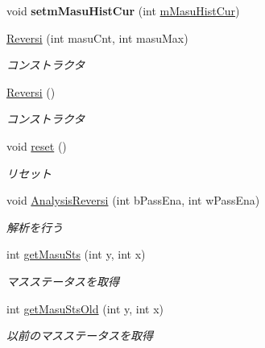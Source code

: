 \begin{DoxyCompactItemize}
void {\bfseries setm\+Masu\+Hist\+Cur} (int \mbox{\hyperlink{classjp_1_1gr_1_1java__conf_1_1yuta__yoshinaga_1_1reversi_1_1model_1_1_reversi_aaedf62ec913875540109bfbe01bb1969}{m\+Masu\+Hist\+Cur}})
\item 
\mbox{\hyperlink{classjp_1_1gr_1_1java__conf_1_1yuta__yoshinaga_1_1reversi_1_1model_1_1_reversi_a22abbc9c1a2016388dafb08dc9a7b820}{Reversi}} (int masu\+Cnt, int masu\+Max)
\begin{DoxyCompactList}\small\item\em コンストラクタ \end{DoxyCompactList}\item 
\mbox{\hyperlink{classjp_1_1gr_1_1java__conf_1_1yuta__yoshinaga_1_1reversi_1_1model_1_1_reversi_a26c832c23ff4e38dd2bcf990d05296d6}{Reversi}} ()
\begin{DoxyCompactList}\small\item\em コンストラクタ \end{DoxyCompactList}\item 
void \mbox{\hyperlink{classjp_1_1gr_1_1java__conf_1_1yuta__yoshinaga_1_1reversi_1_1model_1_1_reversi_a497552844cbae36207f2d8c836a26b8e}{reset}} ()
\begin{DoxyCompactList}\small\item\em リセット \end{DoxyCompactList}\item 
void \mbox{\hyperlink{classjp_1_1gr_1_1java__conf_1_1yuta__yoshinaga_1_1reversi_1_1model_1_1_reversi_a43098c043d0424bb5e5e60db358a324d}{Analysis\+Reversi}} (int b\+Pass\+Ena, int w\+Pass\+Ena)
\begin{DoxyCompactList}\small\item\em 解析を行う \end{DoxyCompactList}\item 
int \mbox{\hyperlink{classjp_1_1gr_1_1java__conf_1_1yuta__yoshinaga_1_1reversi_1_1model_1_1_reversi_aaab64f3b70ed5da5f0707933cbf82802}{get\+Masu\+Sts}} (int y, int x)
\begin{DoxyCompactList}\small\item\em マスステータスを取得 \end{DoxyCompactList}\item 
int \mbox{\hyperlink{classjp_1_1gr_1_1java__conf_1_1yuta__yoshinaga_1_1reversi_1_1model_1_1_reversi_a051aca9eb7ac3ce375a6c017fd0eb400}{get\+Masu\+Sts\+Old}} (int y, int x)
\begin{DoxyCompactList}\small\item\em 以前のマスステータスを取得 \end{DoxyCompactList}\item 

\end{DoxyCompactItemize}
